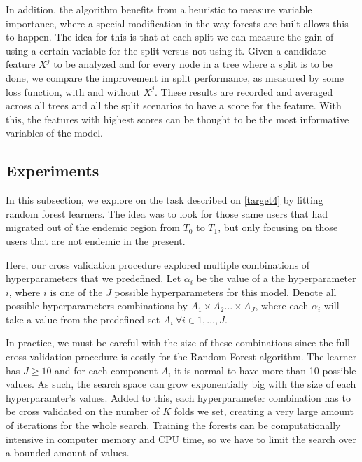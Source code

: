 
In addition, the algorithm benefits from a heuristic to measure variable importance, where a special modification in the way forests are built allows this to happen.
The idea for this is that at each split we can measure the gain of using a certain variable for the split versus not using it.
Given a candidate feature $X^j$ to be analyzed and for every node in a tree where a split is to be done, we compare the improvement in split performance, as measured by some loss function, with and without $X^j$.
These results are recorded and averaged across all trees and all the split scenarios to have a score for the feature.
With this, the features with highest scores can be thought to be the most informative variables of the model.

\subsection{Experiments}\label{subsection:random_forests_experiments}

In this subsection, we explore on the task described on \cref{target4} by fitting random forest learners.
The idea was to look for those same users that had migrated out of the endemic region from  $T_0$ to  $T_1$, but only focusing on those users that are not endemic in the present.

Here, our cross validation procedure explored multiple combinations of hyperparameters that we predefined.
Let $\alpha_i $ be the value of a the hyperparameter $i$, where $i$ is one of the $J$ possible hyperparameters for this model.
Denote all possible hyperparameters combinations by $A_1 \times A_2 \ldots \times  A_J$, where each $\alpha_i$ will take a value from the predefined set $A_i \  \forall i \in {1,\ldots,J}$.

In practice, we must be careful with the size of these combinations since the full cross validation procedure is costly for the Random Forest algorithm.
The learner has $J \geq 10$ and for each component $A_i$ it is normal to have more than 10 possible values.
As such, the search space can grow exponentially big with the size of each hyperparamter's values.
Added to this, each hyperparameter combination has to be cross validated on the number of $K$ folds we set, creating a very large amount of iterations for the whole search.
Training the forests can be computationally intensive in computer memory and CPU time, so we have to limit the search over a bounded amount of values.

